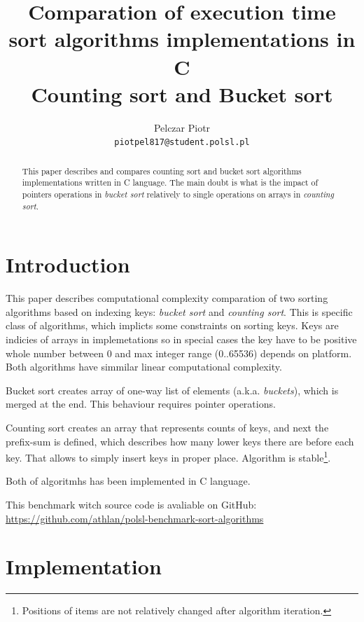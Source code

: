 \documentclass[12pt]{article}
\title{Comparation of execution time sort algorithms implementations in C\\
Counting sort and Bucket sort}
\author{
	  Pelczar Piotr\\
	  \small{\texttt{piotpel817@student.polsl.pl}}
	}
\date{\displaydate{date}}
\begin{document}
\maketitle
 
\begin{abstract}
This paper describes and compares counting sort and bucket sort algorithms implementations written in C language.
The main doubt is what is the impact of pointers operations in \emph{bucket sort} relatively to single operations on arrays
in \emph{counting sort}.
\end{abstract}

\renewcommand{\contentsname}{Contents}

\newpage
\tableofcontents

\newpage
\section{Introduction}
\label{sec:intro}

This paper describes computational complexity comparation of two sorting algorithms based on indexing keys: \emph{bucket sort} and \emph{counting sort}. This is specific class of algorithms, which implicts some constraints on sorting keys. Keys are indicies of arrays in implemetations so in special cases the key have to be positive whole number between 0 and max integer range (0..65536) depends on platform. Both algorithms have simmilar linear computational complexity.

Bucket sort creates array of one-way list of elements (a.k.a. \emph{buckets}), which is merged at the end. This behaviour requires pointer operations\cite{cormen}.

Counting sort creates an array that represents counts of keys, and next the prefix-sum is defined, which describes how many lower keys there are before each key\cite{cormen}. That allows to simply insert keys in proper place. Algorithm is stable\footnote{Positions of items are not relatively changed after algorithm iteration.}.

Both of algoritmhs has been implemented in C language.

This benchmark witch source code is avaliable on GitHub:\\
\url{https://github.com/athlan/polsl-benchmark-sort-algorithms}

\section{Implementation}
\end{document}
